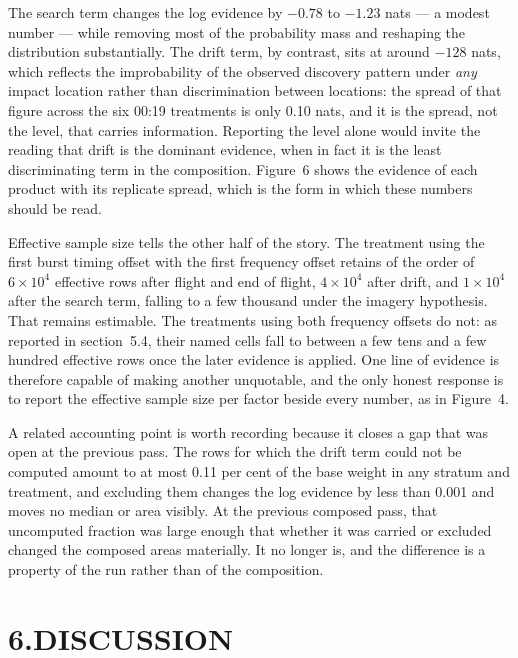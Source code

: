\documentclass[12pt,a4paper]{article}
\begin{document}
The search term changes the log evidence by $-0.78$ to $-1.23$ nats --- a modest number --- while
removing most of the probability mass and reshaping the distribution substantially. The drift
term, by contrast, sits at around $-128$ nats, which reflects the improbability of the observed
discovery pattern under \emph{any} impact location rather than discrimination between locations:
the spread of that figure across the six 00:19 treatments is only 0.10 nats, and it is the spread,
not the level, that carries information. Reporting the level alone would invite the reading that
drift is the dominant evidence, when in fact it is the least discriminating term in the
composition. Figure~6 shows the evidence of each product with its replicate spread, which is the
form in which these numbers should be read.

Effective sample size tells the other half of the story. The treatment using the first burst
timing offset with the first frequency offset retains of the order of $6\times10^{4}$ effective
rows after flight and end of flight, $4\times10^{4}$ after drift, and $1\times10^{4}$ after the
search term, falling to a few thousand under the imagery hypothesis. That remains estimable. The
treatments using both frequency offsets do not: as reported in section~5.4, their named cells
fall to between a few tens and a few hundred effective rows once the later evidence is applied.
One line of evidence is therefore capable of making another unquotable, and the only honest
response is to report the effective sample size per factor beside every number, as in Figure~4.

A related accounting point is worth recording because it closes a gap that was open at the
previous pass. The rows for which the drift term could not be computed amount to at most 0.11 per
cent of the base weight in any stratum and treatment, and excluding them changes the log evidence
by less than 0.001 and moves no median or area visibly. At the previous composed pass, that
uncomputed fraction was large enough that whether it was carried or excluded changed the composed
areas materially. It no longer is, and the difference is a property of the run rather than of the
composition.

\section*{6.\quad DISCUSSION}
\end{document}
